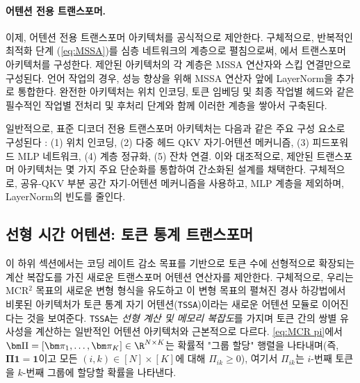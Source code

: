 \documentclass[../../book-main_ko.tex]{subfiles}
\begin{document}
\paragraph{어텐션 전용 트랜스포머.} 이제, 어텐션 전용 트랜스포머 아키텍처를 공식적으로 제안한다. 구체적으로, 반복적인 최적화 단계 (\ref{eq:MSSA})를 심층 네트워크의 계층으로 펼침으로써, 에서 트랜스포머 아키텍처를 구성한다. 제안된 아키텍처의 각 계층은 MSSA 연산자와 스킵 연결만으로 구성된다. 언어 작업의 경우, 성능 향상을 위해 MSSA 연산자 앞에 LayerNorm을 추가로 통합한다. 완전한 아키텍처는 위치 인코딩, 토큰 임베딩 및 최종 작업별 헤드와 같은 필수적인 작업별 전처리 및 후처리 단계와 함께 이러한 계층을 쌓아서 구축된다.




일반적으로, 표준 디코더 전용 트랜스포머 아키텍처는 다음과 같은 주요 구성 요소로 구성된다 \cite{vaswani2017attention}: (1) 위치 인코딩, (2) 다중 헤드 QKV 자기-어텐션 메커니즘, (3) 피드포워드 MLP 네트워크, (4) 계층 정규화, (5) 잔차 연결. 이와 대조적으로, 제안된 트랜스포머 아키텍처는 몇 가지 주요 단순화를 통합하여 간소화된 설계를 채택한다. 구체적으로, 공유-QKV 부분 공간 자기-어텐션 메커니즘을 사용하고, MLP 계층을 제외하며, LayerNorm의 빈도를 줄인다.










\subsection{선형 시간 어텐션: 토큰 통계 트랜스포머}\label{sub:tost} 

이 하위 섹션에서는 코딩 레이트 감소 목표를 기반으로 토큰 수에 선형적으로 확장되는 계산 복잡도를 가진 새로운 트랜스포머 어텐션 연산자를 제안한다. 구체적으로, 우리는 MCR$^2$ 목표의 새로운 변형 형식을 유도하고 이 변형 목표의 펼쳐진 경사 하강법에서 비롯된 아키텍처가 토큰 통계 자기 어텐션(\texttt{TSSA})이라는 새로운 어텐션 모듈로 이어진다는 것을 보여준다. \texttt{TSSA}는 {\em 선형 계산 및 메모리 복잡도}를 가지며 토큰 간의 쌍별 유사성을 계산하는 일반적인 어텐션 아키텍처와 근본적으로 다르다. \eqref{eq:MCR pi}에서 $\bm \Pi = [\bm \pi_1, \ldots, \bm \pi_K] \in \R^{N \times K}$는 확률적 "그룹 할당" 행렬을 나타내며(즉, $\bm \Pi \bm 1 = \bm 1$이고 모든 $(i,k) \in [N] \times [K]$에 대해 $\Pi_{ik} \geq 0$), 여기서 $\Pi_{ik}$는 $i$-번째 토큰을 $k$-번째 그룹에 할당할 확률을 나타낸다.

 
\end{document}
